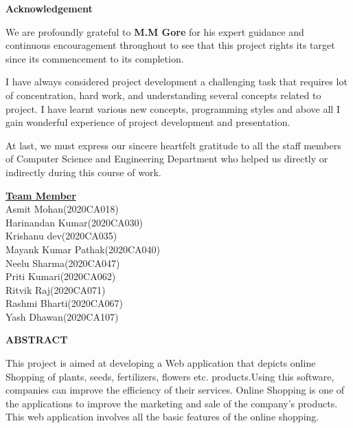 \documentclass[12pt,a4paper]{report}
\begin{document}
		\pagebreak
		\begin{center}
			\doublespacing
			\textbf{\Large Acknowledgement}
		\end{center}
		\vspace{1.3in}
		\begin{center}
			\doublespacing
			We are profoundly grateful to \textbf{M.M Gore} for his expert guidance
			and continuous encouragement throughout to see that this project
			rights its target since its commencement to its completion.
		\end{center}
										
		\begin{center}
			\doublespacing
			I have always considered project development a challenging task that
			requires lot of concentration, hard work, and understanding several
			concepts related to project. I have learnt various new concepts,
			programming styles and above all I gain wonderful experience of project
			development and presentation.
		\end{center}
										
		\begin{center}
			\doublespacing
			At last, we must express our sincere heartfelt gratitude to all the staff
			members of Computer Science and Engineering Department who
			helped us directly or indirectly during this course of work. 
		\end{center}
		\vfill
		\textbf{\underline{\large Team Member}} 
		\onehalfspacing
		\\Asmit Mohan(2020CA018) 
		\\Harinandan Kumar(2020CA030)
		\\Krishanu dev(2020CA035)
		\\Mayank Kumar Pathak(2020CA040)
		\\Neelu Sharma(2020CA047)
		\\Priti Kumari(2020CA062)
		\\Ritvik Raj(2020CA071)
		\\Rashmi Bharti(2020CA067)
		\\Yash Dhawan(2020CA107)
										
		\pagebreak
								
		\onehalfspacing
		\begin{center}
			\doublespacing
			\Large
			\textbf{ABSTRACT}
		\end{center}
										
		\begin{flushleft}
			\doublespacing
			This project is aimed at developing a Web application that depicts online Shopping of plants, seeds, fertilizers, flowers etc. products.Using this software, companies can improve the efficiency of
			their services. Online Shopping is one of the applications to improve the marketing and sale of the company’s products. This web
			application involves all the basic features of the online shopping.
		\end{flushleft}
										
\end{document}
